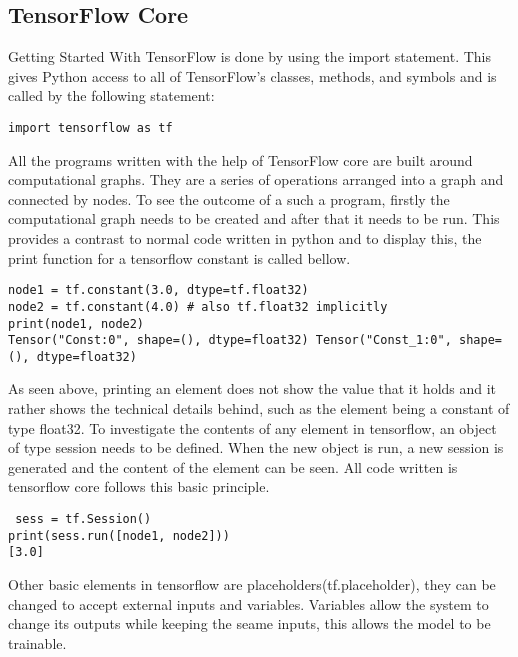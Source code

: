 \subsection{TensorFlow Core}
Getting Started With TensorFlow is done by using the import statement. This gives Python access to all of TensorFlow's classes, methods, and symbols and is called by the following statement:

\begin{lstlisting}
import tensorflow as tf
\end{lstlisting}

All the programs written with the help of TensorFlow core are built around computational graphs. They are a series of operations arranged into a graph and connected by nodes. To see the outcome of a such a program, firstly the computational graph needs to be created and after that it needs to be run. This provides a contrast to normal code written in python and to display this, the print function for a tensorflow constant is called bellow.
\begin{lstlisting}
node1 = tf.constant(3.0, dtype=tf.float32)
node2 = tf.constant(4.0) # also tf.float32 implicitly
print(node1, node2)
Tensor("Const:0", shape=(), dtype=float32) Tensor("Const_1:0", shape=(), dtype=float32) 
\end{lstlisting}

As seen above, printing an element does not show the value that it holds and it rather shows the technical details behind, such as the element being a constant of type float32. To investigate the contents of any element in tensorflow, an object of type session needs to be defined. When the new object is run, a new session is generated and the content of the element can be seen. All code written is tensorflow core follows this basic principle.
 \begin{lstlisting}
 sess = tf.Session()
print(sess.run([node1, node2]))
[3.0]
\end{lstlisting}
Other basic elements in tensorflow are placeholders(tf.placeholder), they can be changed to accept external inputs and variables. Variables allow the system to change its outputs while keeping the seame inputs, this allows the model to be trainable. 

